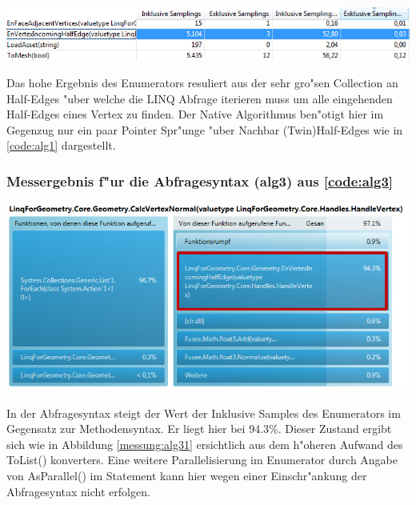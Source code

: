 \documentclass[pagesize, paper=a4, fontsize=12pt,titlepage=true, headings=small, headnosepline, abstractoff, liststotoc, nochapterprefix, plainheadsepline]{scrreprt}
\begin{document}
\begin{minipage}[c][5cm]{\linewidth}
\includegraphics[width=\linewidth]{../Messung/2-linq-envertexinche-1}
\label{messung:alg21}
\end{minipage}

Das hohe Ergebnis des Enumerators resuliert aus der sehr gro"sen Collection an Half-Edges "uber welche die LINQ Abfrage iterieren muss um alle eingehenden Half-Edges eines Vertex zu finden. Der Native Algorithmus ben"otigt hier im Gegenzug nur ein paar Pointer Spr"unge "uber Nachbar (Twin)Half-Edges wie in \ref{code:alg1} dargestellt. \label{ref:linqNativeSampling1}


\subsubsection{Messergebnis f"ur die Abfragesyntax (alg3) aus \ref{code:alg3}}
\begin{minipage}[c][8cm]{\linewidth}
\includegraphics[width=\linewidth]{../Messung/2-linq-calcvertnormals-2}
\label{messung:alg30}
\end{minipage}

In der Abfragesyntax steigt der Wert der Inklusive Samples des Enumerators im Gegensatz zur Methodensyntax. Er liegt hier bei 94.3\%. Dieser Zustand ergibt sich wie in Abbildung \ref{messung:alg31} ersichtlich aus dem h"oheren Aufwand des ToList() konverters. Eine weitere Parallelisierung im Enumerator durch Angabe von AsParallel() im Statement kann hier wegen einer Einschr"ankung der Abfragesyntax nicht erfolgen.
\end{document}
